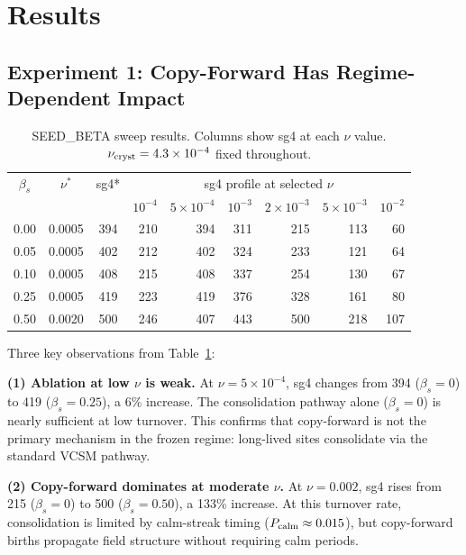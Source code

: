 \documentclass[11pt]{article}
\begin{document}
\section{Results}

\subsection{Experiment 1: Copy-Forward Has Regime-Dependent Impact}

\begin{table}[h]
\centering
\caption{SEED\_BETA sweep results. Columns show sg4 at each $\nu$ value.
$\nu_{\rm cryst}=4.3\times10^{-4}$ fixed throughout.}
\label{tab:exp1}
\small
\begin{tabular}{ccc|rrrrrr}
\toprule
$\beta_s$ & $\nu^*$ & sg4* &
  \multicolumn{6}{c}{sg4 profile at selected $\nu$} \\
& & &
  $10^{-4}$ & $5{\times}10^{-4}$ & $10^{-3}$ & $2{\times}10^{-3}$ &
  $5{\times}10^{-3}$ & $10^{-2}$ \\
\midrule
0.00 & 0.0005 & 394 & 210 & 394 & 311 & 215 & 113 &  60 \\
0.05 & 0.0005 & 402 & 212 & 402 & 324 & 233 & 121 &  64 \\
0.10 & 0.0005 & 408 & 215 & 408 & 337 & 254 & 130 &  67 \\
0.25 & 0.0005 & 419 & 223 & 419 & 376 & 328 & 161 &  80 \\
0.50 & 0.0020 & 500 & 246 & 407 & 443 & 500 & 218 & 107 \\
\bottomrule
\end{tabular}
\end{table}

Three key observations from Table~\ref{tab:exp1}:

\textbf{(1) Ablation at low $\nu$ is weak.} At $\nu=5\times10^{-4}$, sg4 changes
from 394 ($\beta_s=0$) to 419 ($\beta_s=0.25$), a 6\% increase. The
consolidation pathway alone ($\beta_s=0$) is nearly sufficient at low turnover.
This confirms that copy-forward is not the primary mechanism in the frozen
regime: long-lived sites consolidate via the standard VCSM pathway.

\textbf{(2) Copy-forward dominates at moderate $\nu$.} At $\nu=0.002$, sg4
rises from 215 ($\beta_s=0$) to 500 ($\beta_s=0.50$), a 133\% increase.
At this turnover rate, consolidation is limited by calm-streak timing ($P_{\rm
calm}\approx0.015$), but copy-forward births propagate field structure without
requiring calm periods.
\end{document}
